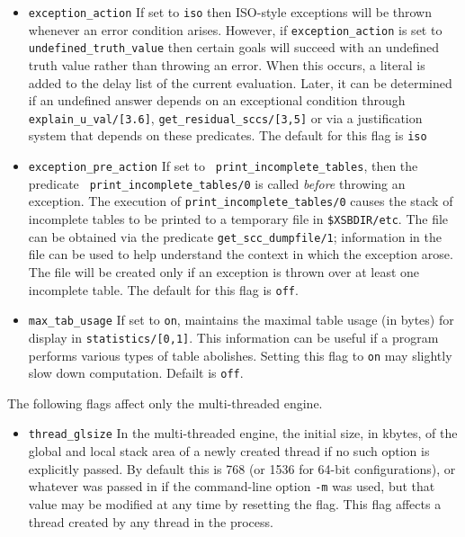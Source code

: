 \begin{description}
\begin{itemize}
\item {\tt exception\_action} If set to {\tt iso} then ISO-style
  exceptions will be thrown whenever an error condition arises.
  However, if {\tt exception\_action} is set to {\tt
    undefined\_truth\_value} then certain goals will succeed with an
  undefined truth value rather than throwing an error.  When this
  occurs, a literal is added to the delay list of the current
  evaluation.  Later, it can be determined if an undefined answer
  depends on an exceptional condition through {\tt
    explain\_u\_val/[3.6]}, {\tt get\_residual\_sccs/[3,5]} or via a
  justification system that depends on these predicates.  The default
  for this flag is {\tt iso}
%
\item {\tt exception\_pre\_action} If set to {\tt
  print\_incomplete\_tables}, then the predicate {\tt
  print\_incomplete\_tables/0} is called {\em before} throwing an
  exception.  The execution of {\tt print\_incomplete\_tables/0}
  causes the stack of incomplete tables to be printed to a temporary
  file in {\tt \$XSBDIR/etc}.  The file can be obtained via the
  predicate {\tt get\_scc\_dumpfile/1}; information in the file can be
  used to help understand the context in which the exception arose.
  The file will be created only if an exception is thrown over at
  least one incomplete table.  The default for this flag is {\tt off}.
%
\item {\tt max\_tab\_usage} If set to {\tt on}, maintains the maximal
  table usage (in bytes) for display in {\tt statistics/[0,1]}.  This
  information can be useful if a program performs various types of
  table abolishes.  Setting this flag to {\tt on} may slightly slow
  down computation.  Defailt is {\tt off}.

\end{itemize}

The following flags affect only the multi-threaded engine.

\begin{itemize}
\item {\tt thread\_glsize} In the multi-threaded engine, the initial
  size, in kbytes, of the global and local stack area of a newly
  created thread if no such option is explicitly passed.  By default
  this is 768 (or 1536 for 64-bit configurations), or whatever was
  passed in if the command-line option {\tt -m} was used, but that
  value may be modified at any time by resetting the flag.  This flag
  affects a thread created by any thread in the process.


\end{itemize}
\end{description}
